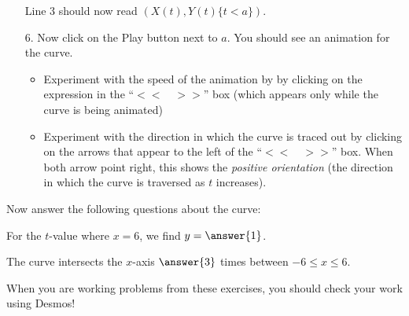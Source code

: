 \documentclass{ximera}
\begin{document}
\begin{exercise}
\begin{itemize}
Line 3 should now read $(X(t),Y(t)\{t<a\} )$.

\item[6.] Now click on the Play button next to $a$.  You should see an animation for the curve.  
\begin{itemize}
\item Experiment with the speed of the animation by by clicking on the expression in the ``$<< \quad >>$'' box (which appears only while the curve is being animated)
\item Experiment with the direction in which the curve is traced out by clicking on the arrows that appear to the left of the ``$<< \quad >>$'' box.  When both arrow point right, this shows the \emph{positive orientation} (the direction in which the curve is traversed as $t$ increases).
\end{itemize}
\end{itemize}

Now answer the following questions about the curve:

For the $t$-value where $x=6$, we find $y=\answer{1}$.

The curve intersects the $x$-axis $\answer{3}$ times between $-6 \leq x \leq 6$.

\begin{remark}
When you are working problems from these exercises, you should check your work using Desmos!
\end{remark}

\end{exercise}
\end{document}
